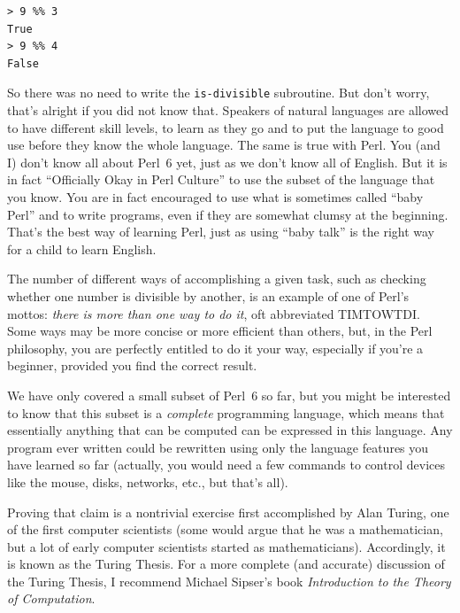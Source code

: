 \begin{verbatim}
> 9 %% 3
True
> 9 %% 4
False
\end{verbatim}

So there was no need to write the {\tt is-divisible} subroutine. 
But don't worry, that's alright if you did not know that. 
Speakers of natural languages are allowed to have different 
skill levels, to learn as they go and to put the language 
to good use before they know the whole language. The same 
is true with Perl. You (and I) don't know all about Perl~6 
yet, just as we don't know all of English. But it is in fact 
``Officially Okay in Perl Culture'' to use the subset of 
the language that you know. You are in fact 
encouraged to use what is sometimes called ``baby Perl'' and 
to write programs, even if they are somewhat clumsy at the 
beginning. That's the best way of learning Perl, just as using 
``baby talk'' is the right way for a child to learn English.

The number of different ways of accomplishing a given task, 
such as checking whether one number is divisible 
by another, is an example of one of Perl's mottos: 
\emph{there is more than 
one way to do it}, oft abbreviated TIMTOWTDI. Some ways may be 
more concise or more efficient than others, but, in the Perl 
philosophy, you are perfectly entitled to do it your way, 
especially if you're a beginner, provided you find the correct 
result.

We have only covered a small subset of Perl~6 so far, but you 
might be interested to know that this subset is a {\em complete}
programming language, which means that essentially anything 
that can be computed can be expressed in this language.  
Any program ever written could be rewritten using only the 
language features you have learned so far (actually, you 
would need a few commands to control devices like the mouse, 
disks, networks, etc., but that's all).

Proving that claim is a nontrivial exercise first accomplished by Alan
Turing, one of the first computer scientists (some would argue that he
was a mathematician, but a lot of early computer scientists started as
mathematicians).  Accordingly, it is known as the Turing Thesis.
For a more complete (and accurate) discussion of the Turing Thesis,
I recommend Michael Sipser's book {\em Introduction to the
Theory of Computation}.

